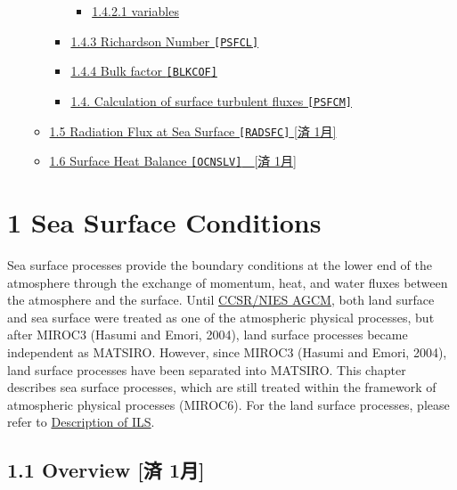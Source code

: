 \begin{itemize}
\begin{itemize}
\begin{itemize}
      \begin{itemize}
      \tightlist
      \item
        \protect\hyperlink{1421-variables}{1.4.2.1 variables}
      \end{itemize}
    \item
      \protect\hyperlink{143-richardson-number-psfcl}{1.4.3 Richardson
      Number \texttt{{[}PSFCL{]}}}
    \item
      \protect\hyperlink{144-bulk-factor-blkcof}{1.4.4 Bulk factor
      \texttt{{[}BLKCOF{]}}}
    \item
      \protect\hyperlink{14-calculation-of-surface-turbulent-fluxes-psfcm}{1.4.
      Calculation of surface turbulent fluxes \texttt{{[}PSFCM{]}}}
    \end{itemize}
  \item
    \protect\hyperlink{15-radiation-flux-at-sea-surface-radsfc-ux6e08-1ux6708}{1.5
    Radiation Flux at Sea Surface \texttt{{[}RADSFC{]}} {[}済 1月{]}}
  \item
    \protect\hyperlink{16-surface-heat-balance-ocnslv-ux6e08-1ux6708}{1.6
    Surface Heat Balance \texttt{{[}OCNSLV{]}}　{[}済 1月{]}}
  \end{itemize}
\end{itemize}

\hypertarget{sea-surface-conditions}{%
\section{1 Sea Surface Conditions}\label{sea-surface-conditions}}

Sea surface processes provide the boundary conditions at the lower end
of the atmosphere through the exchange of momentum, heat, and water
fluxes between the atmosphere and the surface. Until \href{}{CCSR/NIES
AGCM}, both land surface and sea surface were treated as one of the
atmospheric physical processes, but after MIROC3 (Hasumi and Emori,
2004), land surface processes became independent as MATSIRO. However,
since MIROC3 (Hasumi and Emori, 2004), land surface processes have been
separated into MATSIRO. This chapter describes sea surface processes,
which are still treated within the framework of atmospheric physical
processes (MIROC6). For the land surface processes, please refer to
\href{https://github.com/integrated-land-simulator/model_description}{Description
of ILS}.

\hypertarget{overview-ux6e08-1ux6708}{%
\subsection{1.1 Overview {[}済 1月{]}}\label{overview-ux6e08-1ux6708}}

